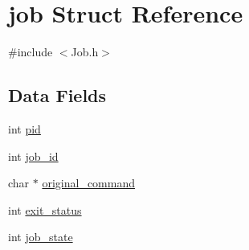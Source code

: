 \hypertarget{structjob}{\section{job Struct Reference}
\label{structjob}
}


{\ttfamily \#include $<$Job.\-h$>$}

\subsection*{Data Fields}
\begin{DoxyCompactItemize}
\item 
int \hyperlink{structjob_a669785e7f9130ed80d5500104ae2f292}{pid}
\item 
int \hyperlink{structjob_aa9ffc87c0ac4bda4c4077493ecafe56e}{job\-\_\-id}
\item 
char $\ast$ \hyperlink{structjob_a8dca5ac3477fe184b8d1e13732b12370}{original\-\_\-command}
\item 
int \hyperlink{structjob_a0934d39f18acc8e4f0c9f00aedf4ec4f}{exit\-\_\-status}
\item 
int \hyperlink{structjob_a9799fc831fbf5f5c21c4eb769849ff6a}{job\-\_\-state}
\end{DoxyCompactItemize}


